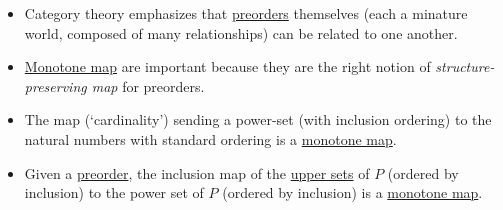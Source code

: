 \begin{itemize}
    \item Category theory emphasizes that \href{doc/1 math/Seven Sketches in Compositionality/1 Generative Effects/Preorders/Preorder}{preorders} themselves (each a minature world, composed of many relationships) can be related to one another.
    \item \href{doc/1 math/Seven Sketches in Compositionality/1 Generative Effects/4 Monotone maps}{Monotone map} are important because they are the right notion of \emph{structure-preserving map} for preorders.
    \item The map (`cardinality') sending a power-set (with inclusion ordering) to the natural numbers with standard ordering is a \href{doc/1 math/Seven Sketches in Compositionality/1 Generative Effects/4 Monotone maps}{monotone map}.
    \item Given a \href{doc/1 math/Seven Sketches in Compositionality/1 Generative Effects/Preorders/Preorder}{preorder}, the inclusion map of the \href{doc/1 math/Seven Sketches in Compositionality/1 Generative Effects/3 Preorders/Upper set}{upper sets} of $P$ (ordered by inclusion) to the power set of $P$ (ordered by inclusion) is a \href{doc/1 math/Seven Sketches in Compositionality/1 Generative Effects/4 Monotone maps}{monotone map}.

  \end{itemize}